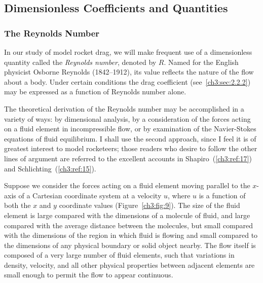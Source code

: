 \subsection{Dimensionless Coefficients and Quantities}\label{ch3:sec:2.2}

\subsubsection{The Reynolds Number}\label{ch3:sec:2.2.1}

In our study of model rocket drag, we will make frequent use of a dimensionless
quantity called the \emph{Reynolds number}, denoted by $R$. Named for the English
physicist Osborne Reynolds (1842--1912), its value reflects the nature of the flow
about a body. Under certain conditions the drag coefficient
(see~\ref{ch3:sec:2.2.2}) may be expressed as a function of Reynolds number alone.

The theoretical derivation of the Reynolds number may be accomplished in a variety
of ways: by dimensional analysis, by a consideration of the forces acting on a
fluid element in incompressible flow, or by examination of the Navier-Stokes
equations of fluid equilibrium. I shall use the second approach, since I feel it
is of greatest interest to model rocketeers; those readers who desire to follow
the other lines of argument are referred to the excellent accounts in
Shapiro~(\ref{ch3:ref:17}) and Schlichting~(\ref{ch3:ref:15}).

Suppose we consider the forces acting on a fluid element moving parallel to the
$x$-axis of a Cartesian coordinate system at a velocity $u$, where $u$ is a
function of both the $x$ and $y$ coordinate values (Figure~\ref{ch3:fig:9}). The
size of the fluid element is large compared with the dimensions of a molecule of
fluid, and large compared with the average distance between the molecules, but
small compared with the dimensions of the region in which fluid is flowing and
small compared to the dimensions of any physical boundary or solid object nearby.
The flow itself is composed of a very large number of fluid elements, such that
variations in density, velocity, and all other physical properties between
adjacent elements are small enough to permit the flow to appear continuous.

